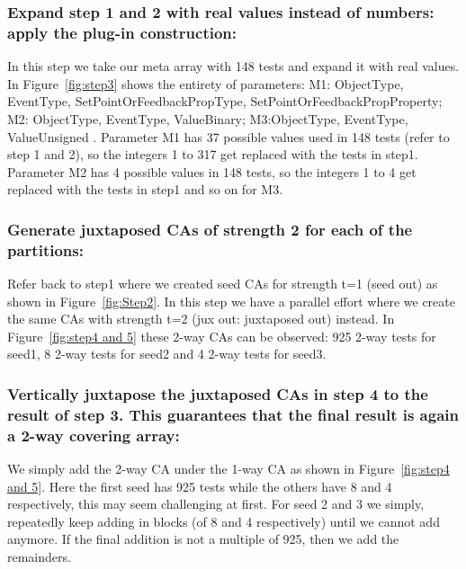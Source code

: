 \documentclass[conference]{IEEEtran}
\begin{document}
		
	
	
	\subsubsection {Expand step 1 and 2 with real values instead of numbers: apply the plug-in construction: } In this step we take our meta array with 148 tests and expand it with real values. In Figure~\ref{fig:step3} shows the entirety of parameters:  
	M1: ObjectType, EventType, SetPointOrFeedbackPropType, SetPointOrFeedbackPropProperty; 
	M2: ObjectType, EventType, ValueBinary; 
	M3:ObjectType, EventType, ValueUnsigned .
	Parameter M1 has 37 possible values used in 148 tests (refer to step 1 and 2), so the integers 1 to 317 get replaced with the tests in step1. 
	Parameter M2 has 4 possible values in 148 tests, so the integers 1 to 4 get replaced with the tests in step1 and so on for M3.
		
	
	
	
	\subsubsection {Generate juxtaposed CAs of strength 2 for each of the partitions: } Refer back to step1 where we created seed CAs for strength t=1 (seed out) as shown in Figure~\ref{fig:Step2}. 
	In this step we have a parallel effort where we create the same CAs with strength t=2 (jux out: juxtaposed out) instead. 
	In Figure~\ref{fig:step4 and 5} these 2-way CAs can be observed: 925 2-way tests for seed1, 8 2-way tests for seed2 and 4 2-way tests for seed3. 
	

	
	\subsubsection {Vertically juxtapose the juxtaposed CAs in step 4 to the result of step 3. This guarantees that the final result is again a 2-way covering array: } We simply add the 2-way CA under the 1-way CA as shown in Figure~\ref{fig:step4 and 5}. Here the first seed has 925 tests while the others have 8 and 4 respectively, this may seem challenging at first. 
	For seed 2 and 3 we simply, repeatedly keep adding in blocks (of 8 and 4 respectively) until we cannot add anymore. If the final addition is not a multiple of 925, then we add the remainders. 
\end{document}
